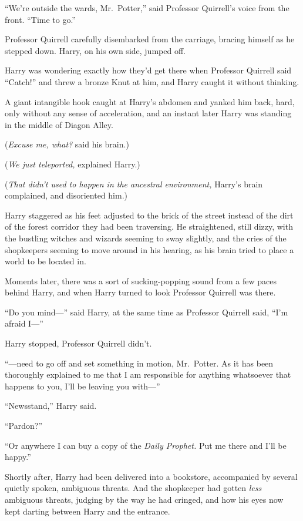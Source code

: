 ``We're outside the wards, Mr.~Potter,'' said Professor Quirrell's voice
from the front. ``Time to go.''

Professor Quirrell carefully disembarked from the carriage, bracing
himself as he stepped down. Harry, on his own side, jumped off.

Harry was wondering exactly how they'd get there when Professor Quirrell
said ``Catch!'' and threw a bronze Knut at him, and Harry caught it
without thinking.

A giant intangible hook caught at Harry's abdomen and yanked him back,
hard, only without any sense of acceleration, and an instant later Harry
was standing in the middle of Diagon Alley.

(\emph{Excuse me, what?} said his brain.)

(\emph{We just teleported,} explained Harry.)

(\emph{That didn't used to happen in the ancestral environment,} Harry's
brain complained, and disoriented him.)

Harry staggered as his feet adjusted to the brick of the street instead
of the dirt of the forest corridor they had been traversing. He
straightened, still dizzy, with the bustling witches and wizards seeming
to sway slightly, and the cries of the shopkeepers seeming to move
around in his hearing, as his brain tried to place a world to be located
in.

Moments later, there was a sort of sucking-popping sound from a few
paces behind Harry, and when Harry turned to look Professor Quirrell was
there.

``Do you mind---'' said Harry, at the same time as Professor Quirrell
said, ``I'm afraid I---''

Harry stopped, Professor Quirrell didn't.

``---need to go off and set something in motion, Mr.~Potter. As it has
been thoroughly explained to me that I am responsible for anything
whatsoever that happens to you, I'll be leaving you with---''

``Newsstand,'' Harry said.

``Pardon?''

``Or anywhere I can buy a copy of the \emph{Daily Prophet.} Put me there
and I'll be happy.''

Shortly after, Harry had been delivered into a bookstore, accompanied by
several quietly spoken, ambiguous threats. And the shopkeeper had gotten
\emph{less} ambiguous threats, judging by the way he had cringed, and
how his eyes now kept darting between Harry and the entrance.

